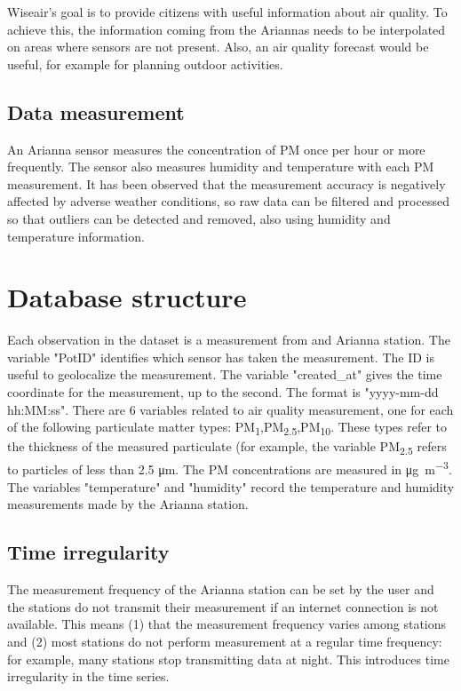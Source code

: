\documentclass{article}
\begin{document}
Wiseair's goal is to provide citizens with useful information about air quality. To achieve this, the information coming from
 the Ariannas needs to be interpolated on areas where sensors are not present. Also, an air quality forecast would be useful,
  for example for planning outdoor activities. 

\subsection{Data measurement}

An Arianna sensor measures the concentration of PM once per hour or more frequently. The sensor also measures humidity and 
temperature with each PM measurement. It has been observed that the measurement accuracy is negatively affected by adverse weather
 conditions, so raw data can be filtered and processed so that outliers can be detected and removed, also using humidity and temperature information.

\section{Database structure}

Each observation in the dataset is a measurement from and Arianna station. 
The variable "PotID" identifies which sensor has taken the measurement. The ID is useful to geolocalize the measurement.
The variable "created\_at" gives the time coordinate for the measurement, up to the second. The format is "yyyy-mm-dd hh:MM:ss".
There are 6 variables related to air quality measurement, one for each of the following particulate matter types: PM\textsubscript{1},PM\textsubscript{2.5},PM\textsubscript{10}.
 These types refer to the thickness of the measured particulate (for example, the variable PM\textsubscript{2.5} refers to particles of less than 2.5 \si{\micro\meter}. The
 PM concentrations are measured in \si{\micro\gram\per\cubic\meter}.
The variables "temperature" and "humidity" record the temperature and humidity measurements made by the Arianna station.

\subsection{Time irregularity}

The measurement frequency of the Arianna station can be set by the user and the stations do not transmit their measurement if an internet connection is not
available. This means (1) that the measurement frequency varies among stations and (2) most stations do not perform measurement at a regular time frequency:
for example, many stations stop transmitting data at night. This introduces time irregularity in the time series. 
\end{document}
